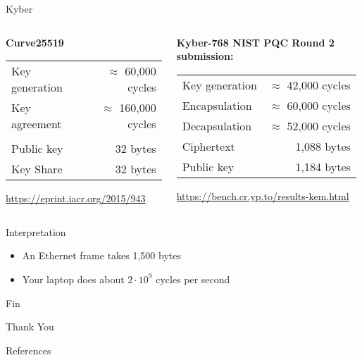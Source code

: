 \documentclass[xcolor=table,10pt,aspectratio=169]{beamer}
\begin{document}
\begin{frame}[label={sec:orga47d8d6}]{Kyber}
\begin{columns}[t]
\begin{column}{0.5\columnwidth}
\textbf{Curve25519}

\begin{center}
\begin{tabular}{lr}
Key generation & \(\approx\) 60,000 cycles\\
Key agreement & \(\approx\) 160,000 cycles\\
 & \\
Public key & 32 bytes\\
Key Share & 32 bytes\\
\end{tabular}

\end{center}

\small \url{https://eprint.iacr.org/2015/943}
\end{column}

\begin{column}{0.5\columnwidth}
\textbf{Kyber-768 NIST PQC Round 2 submission:}

\begin{center}
\begin{tabular}{lr}
Key generation & \(\approx\)  42,000 cycles\\
Encapsulation & \(\approx\)  60,000 cycles\\
Decapsulation & \(\approx\)  52,000 cycles\\
Ciphertext & 1,088 bytes\\
Public key & 1,184 bytes\\
\end{tabular}

\end{center}

\small \url{https://bench.cr.yp.to/results-kem.html}
\end{column}
\end{columns}

\begin{block}{Interpretation}
\begin{itemize}
\item An Ethernet frame takes 1,500 bytes
\item Your laptop does about \(2\cdot 10^{9}\) cycles per second
\end{itemize}
\end{block}
\end{frame}

\begin{frame}[label={sec:org70e71b1},standout]{Fin}
\begin{center}
\Huge \alert{Thank You}
\end{center}
\end{frame}

\begin{frame}[allowframebreaks]{References}
\renewcommand*{\bibfont}{\scriptsize}
\printbibliography[heading=none]
\end{frame}
\end{document}
